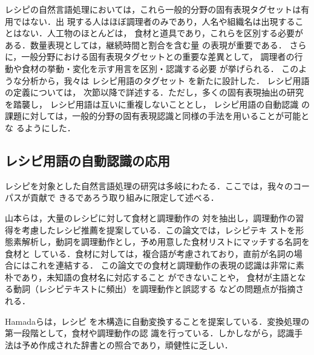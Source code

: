 \documentclass[japanese]{jnlp_1.4}
\begin{document}
レシピの自然言語処理においては，これら一般的分野の固有表現タグセットは有用ではない．出
現する人はほぼ調理者のみであり，人名や組織名は出現することはない．人工物のほとんどは，
食材と道具であり，これらを区別する必要がある．数量表現としては，継続時間と割合を含む量
の表現が重要である．
さらに，一般分野における固有表現タグセットとの重要な差異として，
調理者の行動や食材の挙動・変化を示す用言を区別・認識する必要
\cite{Structural.Analysis.of.Cooking.Preparation.Steps.in.Japanese}
が挙げられる．
このような分析から，我々は
レシピ用語のタグセット
を新たに設計した．
レシピ用語の定義については，
次節以降で詳述する．ただし，多くの固有表現抽出の研究を踏襲し，
レシピ用語は互いに重複しないこととし，
レシピ用語の自動認識
の課題に対しては，一般的分野の固有表現認識と同様の手法を用いることが可能とな
るようにした．


\subsection{レシピ用語の自動認識の応用}

レシピを対象とした自然言語処理の研究は多岐にわたる．ここでは，我々のコーパスが貢献で
きるであろう取り組みに限定して述べる．

山本ら\cite{食材調理法の習得順に関する一検討}は，大量のレシピに対して食材と調理動作の
対を抽出し，調理動作の習得を考慮したレシピ推薦を提案している．この論文では，レシピテキ
ストを形態素解析し，動詞を調理動作とし，予め用意した食材リストにマッチする名詞を食材と
している．食材に対しては，複合語が考慮されており，直前が名詞の場合にはこれを連結する．
この論文での食材と調理動作の表現の認識は非常に素朴であり，未知語の食材名に対応すること
ができないことや，
食材が主語となる動詞（レシピテキストに頻出）を調理動作と誤認する
などの問題点が指摘される．

Hamadaら\cite{Structural.Analysis.of.Cooking.Preparation.Steps.in.Japanese}は，レシピ
を木構造に自動変換することを提案している．変換処理の第一段階として，食材や調理動作の認
識を行っている．しかしながら，認識手法は予め作成された辞書との照合であり，頑健性に乏しい．
\end{document}
